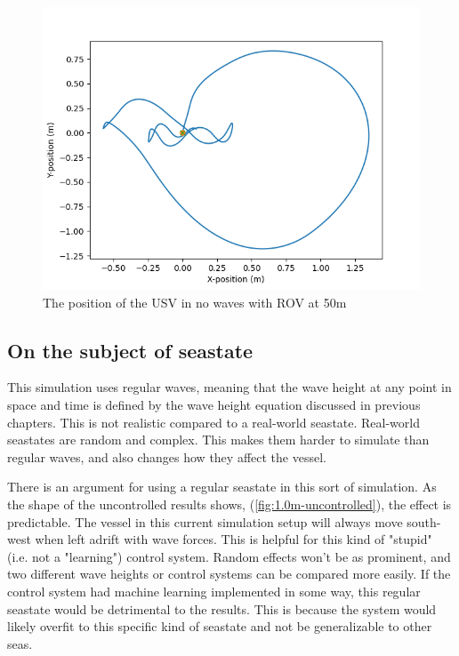 \documentclass[class=article, crop=false]{standalone}
\begin{document}
\begin{figure}
    \centering
    \includegraphics{scenario1/rov-50m/0.0m/usv_position_controlled}
    \caption{The position of the USV in no waves with ROV at 50m}
    \label{fig:nowaves}
\end{figure}

\subsection{On the subject of seastate}
This simulation uses regular waves, meaning that the wave height at any point in space and time is defined by the wave height equation discussed in previous chapters. This is not realistic compared to a real-world seastate. Real-world seastates are random and complex. This makes them harder to simulate than regular waves, and also changes how they affect the vessel.

There is an argument for using a regular seastate in this sort of simulation. As the shape of the uncontrolled results shows, (\cref{fig:1.0m-uncontrolled}), the effect is predictable. The vessel in this current simulation setup will always move south-west when left adrift with wave forces. This is helpful for this kind of "stupid" (i.e. not a "learning") control system. Random effects won't be as prominent, and two different wave heights or control systems can be compared more easily. If the control system had machine learning implemented in some way, this regular seastate would be detrimental to the results. This is because the system would likely overfit to this specific kind of seastate and not be generalizable to other seas.
\end{document}
